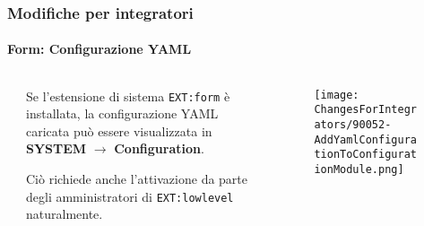 \begin{frame}[fragile]
	\frametitle{Modifiche per integratori}
	\framesubtitle{Form: Configurazione YAML}

	\begin{columns}[T]
		\begin{column}{.04\textwidth}
		\end{column}
		\begin{column}{.38\textwidth}

			Se l'estensione di sistema \texttt{EXT:form} è installata, la configurazione YAML caricata
			può essere visualizzata in \textbf{SYSTEM} $\rightarrow$ \textbf{Configuration}.

			\vspace{0.2cm}

			Ciò richiede anche l'attivazione da parte degli amministratori di \texttt{EXT:lowlevel} naturalmente.

		\end{column}
		\begin{column}{.58\textwidth}
			\vspace{-0.3cm}
			\begin{figure}
				\texttt{[image: ChangesForIntegrators/90052-AddYamlConfigurationToConfigurationModule.png]}
			\end{figure}
		\end{column}
	\end{columns}

\end{frame}


